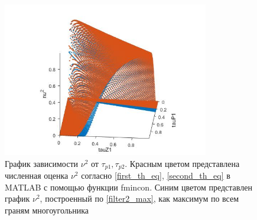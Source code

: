 \documentclass[a4paper,article,14pt]{extarticle}
\begin{document}
\begin{figure}[H]
\centering
\includegraphics[width=9cm]{images/filter2_agregated.jpg}
\caption{График зависимости $\nu^2$ от $\tau_{p1}, \tau_{p2}$. Красным цветом представлена численная оценка $\nu^2$ согласно \eqref{first_th_eq}, \eqref{second_th_eq} в MATLAB с помощью функции fmincon. Синим цветом представлен график $\nu^2$, построенный по \eqref{filter2_max}, как максимум по всем граням многоугольника}
\end{figure}


\pagebreak
\end{document}
